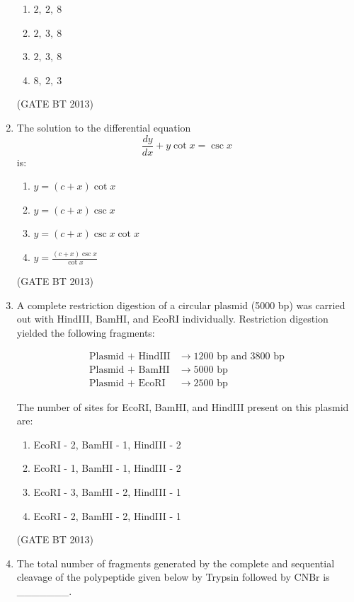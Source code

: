 \documentclass[journal,12pt,onecolumn]{IEEEtran}
\theoremstyle{remark}
\begin{document}
\begin{enumerate}
\begin{enumerate}
    \item $2,\ 2,\ 8$
    \item $2,\ 3,\ 8$
    \item $2,\ 3,\ 8$
    \item $8,\ 2,\ 3$
\end{enumerate} \hfill(GATE BT 2013)

\item 

The solution to the differential equation 
\[
\frac{dy}{dx} + y \cot x = \csc x
\]
is:

\begin{enumerate}
    \item \( y = (c + x) \cot x \)
    \item \( y = (c + x) \csc x \)
    \item \( y = (c + x) \csc x \cot x \)
    \item \( y = \frac{(c + x) \csc x}{\cot x} \)
\end{enumerate} \hfill(GATE BT 2013)

\item 

A complete restriction digestion of a circular plasmid (5000 bp) was carried out with HindIII, BamHI, and EcoRI individually. Restriction digestion yielded the following fragments:

\[
\begin{aligned}
\text{Plasmid + HindIII} &\to 1200 \text{ bp and } 3800 \text{ bp} \\
\text{Plasmid + BamHI} &\to 5000 \text{ bp} \\
\text{Plasmid + EcoRI} &\to 2500 \text{ bp}
\end{aligned}
\]

The number of sites for EcoRI, BamHI, and HindIII present on this plasmid are:

\begin{enumerate}
    \item EcoRI - 2, BamHI - 1, HindIII - 2
    \item EcoRI - 1, BamHI - 1, HindIII - 2
    \item EcoRI - 3, BamHI - 2, HindIII - 1
    \item EcoRI - 2, BamHI - 2, HindIII - 1
\end{enumerate} \hfill(GATE BT 2013)

\item 

The total number of fragments generated by the complete and sequential cleavage of the polypeptide given below by Trypsin followed by CNBr is \_\_\_\_\_\_\_.


\end{enumerate}
\end{document}
